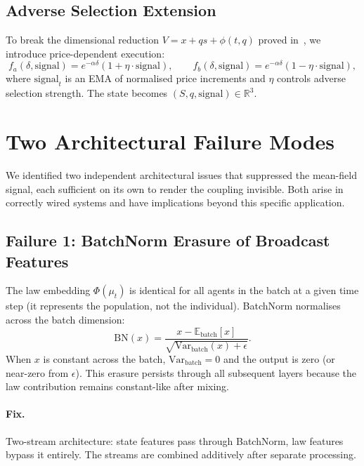 \documentclass[11pt,a4paper]{article}
\newcommand{\E}{\mathbb{E}}
\newcommand{\R}{\mathbb{R}}
\newcommand{\mup}{\mu_t}
\begin{document}
\subsection{Adverse Selection Extension}

To break the dimensional reduction $V = x + qs + \phi(t,q)$ proved in~\cite{garry2026preprint1}, we introduce price-dependent execution:
\begin{equation}\label{eq:adverse}
  f_a(\delta, \text{signal}) = e^{-\alpha\delta}(1 + \eta \cdot \text{signal}), \qquad
  f_b(\delta, \text{signal}) = e^{-\alpha\delta}(1 - \eta \cdot \text{signal}),
\end{equation}
where $\text{signal}_t$ is an EMA of normalised price increments and $\eta$ controls adverse selection strength. The state becomes $(S, q, \text{signal}) \in \R^3$.

\section{Two Architectural Failure Modes}
\label{sec:failures}

We identified two independent architectural issues that suppressed the mean-field signal, each sufficient on its own to render the coupling invisible. Both arise in correctly wired systems and have implications beyond this specific application.

\subsection{Failure 1: BatchNorm Erasure of Broadcast Features}

The law embedding $\Phi(\mup)$ is identical for all agents in the batch at a given time step (it represents the population, not the individual). BatchNorm normalises across the batch dimension:
\[
  \text{BN}(x) = \frac{x - \E_{\text{batch}}[x]}{\sqrt{\text{Var}_{\text{batch}}(x) + \epsilon}}.
\]
When $x$ is constant across the batch, $\text{Var}_{\text{batch}} = 0$ and the output is zero (or near-zero from $\epsilon$). This erasure persists through all subsequent layers because the law contribution remains constant-like after mixing.

\paragraph{Fix.} Two-stream architecture: state features pass through BatchNorm, law features bypass it entirely. The streams are combined additively after separate processing.
\end{document}

